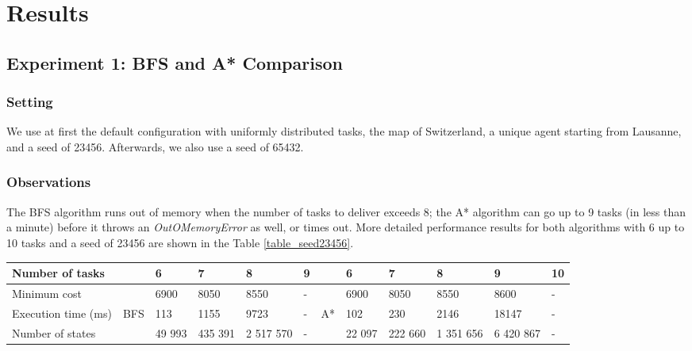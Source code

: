 \documentclass[10pt]{article}
\begin{document}
\section{Results}

\subsection{Experiment 1: BFS and A* Comparison}

\subsubsection{Setting}
We use at first the default configuration with uniformly distributed tasks, the map of Switzerland, a unique agent starting from Lausanne, and a seed of 23456. Afterwards, we also use a seed of 65432.

\subsubsection{Observations}
The BFS algorithm runs out of memory when the number of tasks to deliver exceeds 8; the A* algorithm can go up to 9 tasks (in less than a minute) before it throws an \textit{OutOMemoryError} as well, or times out.
More detailed performance results for both algorithms with 6 up to 10 tasks and a seed of 23456 are shown in the Table \ref{table_seed23456}.\\

\begin{adjustwidth}{0cm}{}
\begin{tabular}{|l|lllll|llllll|}
\hline
Number of tasks & & 6 & 7 & 8 & 9 & & 6 & 7 & 8 & 9 & 10\\
\hline
Minimum cost & & 6900 & 8050 & 8550 & - & & 6900 & 8050 & 8550 & 8600 & -\\
Execution time (ms) & BFS & 113 & 1155 & 9723 & - & A* & 102 & 230 & 2146 & 18147 & -\\
Number of states & & 49 993 & 435 391 & 2 517 570 & - & & 22 097 & 222 660 & 1 351 656 & 6 420 867 & -\\
\hline
\end{tabular}
\label{table_seed23456}
\end{adjustwidth}
\vspace{4mm}
\end{document}

